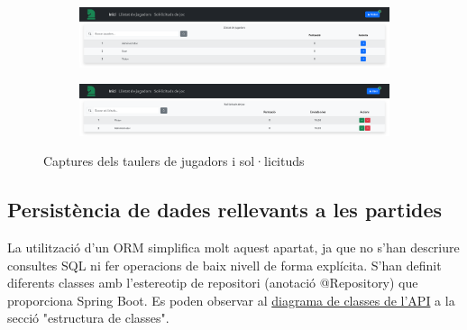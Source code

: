 \begin{figure}[H]
     \centering
     \begin{subfigure}[b]{0.8\textwidth}
         \centering
         \includegraphics[width=\textwidth]{images/jugadors.png}
         \label{fig:Login}
     \end{subfigure}
     \begin{subfigure}[b]{0.8\textwidth}
         \centering
         \includegraphics[width=\textwidth]{images/solicituds.png}
         \label{fig:Registre}
     \end{subfigure}
        \caption{Captures dels taulers de jugadors i sol·licituds}
        \label{fig:Captures dels taulers de jugadors i sol·licituds}
\end{figure}
\subsection{Persistència de dades rellevants a les partides}
La utilització d'un ORM simplifica molt aquest apartat, ja que no s'han descriure consultes SQL ni fer operacions de baix nivell de forma explícita. S'han definit diferents classes amb l'estereotip de repositori (anotació @Repository) que proporciona Spring Boot. Es poden observar al \hyperref[fig:Diagrama de classes de l'API]{diagrama de classes de l’API} a la secció "estructura de classes".
